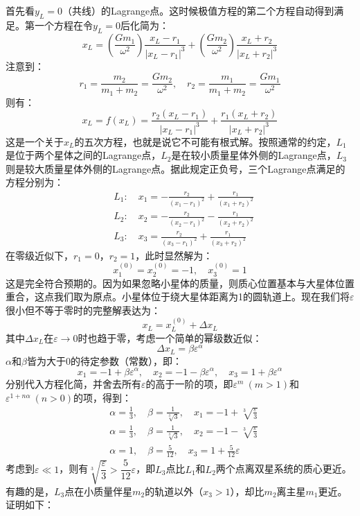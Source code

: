 \documentclass[a4paper,openany]{book}
\begin{document}
首先看$y_L = 0$（共线）的Lagrange点。这时候极值方程的第二个方程自动得到满足。第一个方程在令$y_L = 0$后化简为：
\[
    x_L = \left(\frac{Gm_1}{\omega^2}\right)\frac{x_L-r_1}{|x_L-r_1|^3} + \left(\frac{Gm_2}{\omega^2}\right)\frac{x_L+r_2}{|x_L+r_2|^3}
\]
注意到：
\[
    r_1 = \frac{m_2}{m_1+m_2} = \frac{Gm_2}{\omega^2},\quad
r_2 = \frac{m_1}{m_1+m_2} = \frac{Gm_1}{\omega^2}
\]
则有：
\[
    x_L = f(x_L) = \frac{r_2(x_L-r_1)}{|x_L-r_1|^3} + \frac{r_1(x_L+r_2)}{|x_L+r_2|^3}
\]
这是一个关于$x_L$的五次方程，也就是说它不可能有根式解。按照通常的约定，$L_1$是位于两个星体之间的Lagrange点，$L_2$是在较小质量星体外侧的Lagrange点，$L_3$则是较大质量星体外侧的Lagrange点。据此规定正负号，三个Lagrange点满足的方程分别为：
\begin{align*}
    &L_1:\quad x_1 = -\frac{r_2}{(x_1-r_1)^2} + \frac{r_1}{(x_1+r_2)^2} \\
    &L_2:\quad x_2 = -\frac{r_2}{(x_2-r_1)^2} - \frac{r_1}{(x_2+r_2)^2} \\
    &L_3:\quad x_3 = \frac{r_2}{(x_3-r_1)^2} + \frac{r_1}{(x_3+r_2)^2}
\end{align*}
在零级近似下，$r_1=0$，$r_2=1$，此时显然解为：
\[
    x_1^{(0)} = x_2^{(0)} = -1,\quad x_3^{(0)} = 1
\]
这是完全符合预期的。因为如果忽略小星体的质量，则质心位置基本与大星体位置重合，这点我们取为原点。小星体位于绕大星体距离为1的圆轨道上。现在我们将$\varepsilon$很小但不等于零时的完整解表达为：
\[
    x_L = x_L^{(0)} + \Delta x_L
\]
其中$\Delta x_L$在$\varepsilon \to 0$时也趋于零，考虑一个简单的幂级数近似：
\[
    \Delta x_L = \beta\varepsilon^\alpha
\]
$\alpha$和$\beta$皆为大于0的待定参数（常数），即：
\[
    x_1 = -1 + \beta\varepsilon^\alpha,\quad
x_2 = -1 - \beta\varepsilon^\alpha,\quad
x_3 = 1 + \beta\varepsilon^\alpha
\]
分别代入方程化简，并舍去所有$\varepsilon$的高于一阶的项，即$\varepsilon^m\ (m>1)$和$\varepsilon^{1+n\alpha}\ (n>0)$的项，得到：
\begin{align*}
    & \alpha = \frac{1}{3},\quad \beta = \frac{1}{\sqrt[3]{3}},\quad x_1 = -1 + \sqrt[3]{\frac{\varepsilon}{3}} \\
    & \alpha = \frac{1}{3},\quad \beta = \frac{1}{\sqrt[3]{3}},\quad x_2 = -1 - \sqrt[3]{\frac{\varepsilon}{3}} \\
    & \alpha = 1,\quad \beta = \frac{5}{12},\quad x_3 = 1 + \frac{5}{12}\varepsilon
\end{align*}
考虑到$\varepsilon\ll1$，则有$\sqrt[3]{\dfrac{\varepsilon}{3}} > \dfrac{5}{12}\varepsilon$，即$L_3$点比$L_1$和$L_2$两个点离双星系统的质心更近。有趣的是，$L_3$点在小质量伴星$m_2$的轨道以外（$x_3>1$），却比$m_2$离主星$m_1$更近。证明如下：
\end{document}
